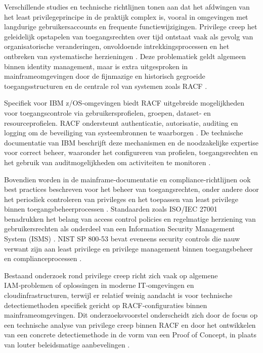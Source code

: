 Verschillende studies en technische richtlijnen tonen aan dat het afdwingen van het least privilegeprincipe in de praktijk complex is, vooral in omgevingen met langdurige gebruikersaccounts en frequente functiewijzigingen. Privilege creep het geleidelijk opstapelen van toegangsrechten over tijd  ontstaat vaak als gevolg van organisatorische veranderingen, onvoldoende intrekkingsprocessen en het ontbreken van systematische herzieningen \autocite{Jain2025, Romero2025}. Deze problematiek geldt algemeen binnen identity management, maar is extra uitgesproken in mainframeomgevingen door de fijnmazige en historisch gegroeide toegangsstructuren en de centrale rol van systemen zoals RACF \autocite{Corporation2026, ADMINGUIDE2026}.

Specifiek voor IBM z/OS‑omgevingen biedt RACF uitgebreide mogelijkheden voor toegangscontrole via gebruikersprofielen, groepen, dataset‑ en resourceprofielen. RACF ondersteunt authenticatie, autorisatie, auditing en logging om de beveiliging van systeembronnen te waarborgen \autocite{ADMINGUIDE2026, Corporation2026}. De technische documentatie van IBM beschrijft deze mechanismen en de noodzakelijke expertise voor correct beheer, waaronder het configureren van profielen, toegangsrechten en het gebruik van auditmogelijkheden om activiteiten te monitoren \autocite{ADMINGUIDE2026}.

Bovendien worden in de mainframe‑documentatie en compliance‑richtlijnen ook best practices beschreven voor het beheer van toegangsrechten, onder andere door het periodiek controleren van privileges en het toepassen van least privilege binnen toegangsbeheerprocessen \autocite{RACFIMPLEMENTATION2026, ISO27001}. Standaarden zoals ISO/IEC 27001 benadrukken het belang van access control policies en regelmatige herziening van gebruikersrechten als onderdeel van een Information Security Management System (ISMS) \autocite{ISO27001}. NIST SP 800‑53 bevat eveneens security controls die nauw verwant zijn aan least privilege en privilege management binnen toegangsbeheer en complianceprocessen \autocite{Force2026}.

Bestaand onderzoek rond privilege creep richt zich vaak op algemene IAM‑problemen of oplossingen in moderne IT‑omgevingen en cloudinfrastructuren, terwijl er relatief weinig aandacht is voor technische detectiemethoden specifiek gericht op RACF‑configuraties binnen mainframeomgevingen. Dit onderzoeksvoorstel onderscheidt zich door de focus op een technische analyse van privilege creep binnen RACF en door het ontwikkelen van een concrete detectiemethode in de vorm van een Proof of Concept, in plaats van louter beleidsmatige aanbevelingen \autocite{Jain2025, Romero2025}.

